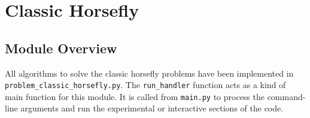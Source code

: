 \documentclass[11.5pt]{report}
\begin{document}
\chapter{Classic Horsefly}
\label{chap:classic-horsefly}

\section{Module Overview}

\newchunk 
All algorithms to solve the classic horsefly problems have been implemented in 
\verb|problem_classic_horsefly.py|. The \verb|run_handler| function acts 
as a kind of main function for this module. It is called from 
\verb|main.py| to process the command-line arguments and run the 
experimental or interactive sections of the code. 
\end{document}
